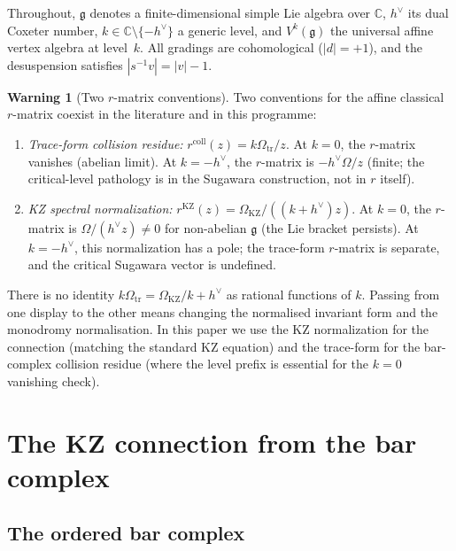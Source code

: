 \documentclass[11pt,reqno]{amsart}
\theoremstyle{definition}
\newtheorem{warning}[theorem]{Warning}
\theoremstyle{remark}
\newcommand{\fg}{\mathfrak{g}}
\newcommand{\CC}{\mathbb{C}}
\newcommand{\hv}{h^{\vee}}
\newcommand{\kp}{k + h^{\vee}}
\numberwithin{equation}{section}
\begin{document}
Throughout, $\fg$ denotes a finite-dimensional simple Lie
algebra over $\CC$, $\hv$ its dual Coxeter number,
$k \in \CC \setminus \{-\hv\}$ a generic level, and
$V^k(\fg)$ the universal affine vertex algebra at
level~$k$.  All gradings are cohomological ($|d| = +1$),
and the desuspension satisfies $|s^{-1}v| = |v| - 1$.

\begin{warning}[Two $r$-matrix conventions]
\label{warn:dk-two-conventions}
Two conventions for the affine classical $r$-matrix
coexist in the literature and in this programme:
\begin{enumerate}[label=(\roman*)]
\item \emph{Trace-form collision residue:}
  $r^{\mathrm{coll}}(z) = k\Omega_{\mathrm{tr}}/z$.
  At $k = 0$, the $r$-matrix vanishes (abelian limit).
  At $k = -\hv$, the $r$-matrix is $-\hv\Omega/z$ (finite;
  the critical-level pathology is in the Sugawara
  construction, not in $r$ itself).
\item \emph{KZ spectral normalization:}
  $r^{\mathrm{KZ}}(z) = \Omega_{\mathrm{KZ}}/((\kp)z)$.
  At $k = 0$, the $r$-matrix is $\Omega/(\hv z) \neq 0$
  for non-abelian $\fg$ (the Lie bracket persists).
  At $k = -\hv$, this normalization has a pole; the trace-form
  $r$-matrix is separate, and the critical Sugawara vector is undefined.
\end{enumerate}
There is no identity \(k\Omega_{\mathrm{tr}}=\Omega_{\mathrm{KZ}}/\kp\)
as rational functions of \(k\).  Passing from one display to the other
means changing the normalised invariant form and the monodromy
normalisation.
In this paper we use the KZ normalization for
the connection (matching the standard KZ equation) and the
trace-form for the bar-complex collision residue (where the
level prefix is essential for the $k = 0$ vanishing check).
\end{warning}

\section{The KZ connection from the bar complex}
\label{sec:dk-kz}

\subsection{The ordered bar complex}
\end{document}

